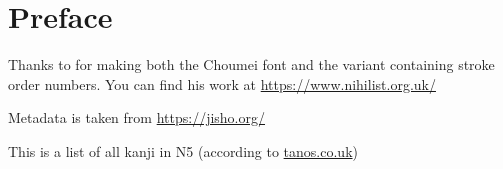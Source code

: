 \documentclass{article}
\begin{document}


\break

\tableofcontents
\break

\section*{Preface}

Thanks to for making both the Choumei font and the variant containing stroke order numbers. You can find his work at \url{https://www.nihilist.org.uk/}

Metadata is taken from \url{https://jisho.org/}

This is a list of all kanji in N5 (according to \href{http://www.tanos.co.uk/jlpt/skills/kanji/}{tanos.co.uk})

\break





% 


% 


% 


% 
\end{document}
